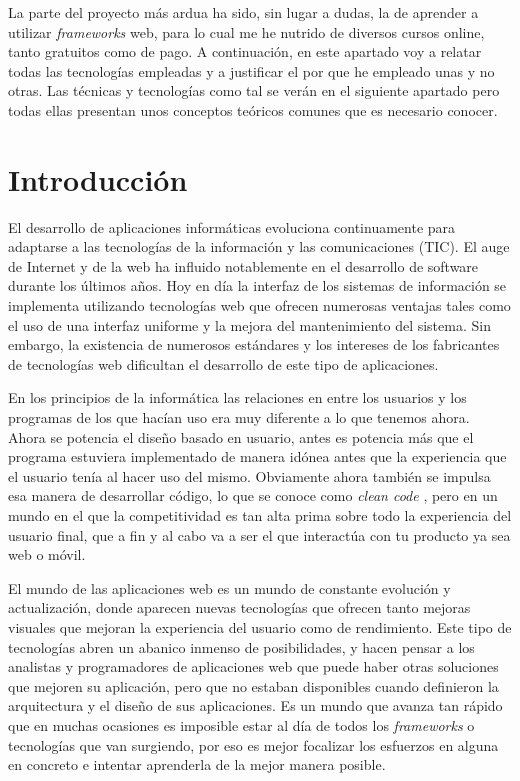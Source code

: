
La parte del proyecto más ardua ha sido, sin lugar a dudas, la de aprender a utilizar \emph{frameworks}  web, para lo cual me he nutrido de diversos cursos online, tanto gratuitos como de pago. A continuación, en este apartado voy a relatar todas las tecnologías empleadas y a justificar el por que he empleado unas y no otras. Las técnicas y tecnologías como tal se verán en el siguiente apartado pero todas ellas presentan unos conceptos teóricos comunes que es necesario conocer. 


\section{Introducción}\label{teorico-introduccion}
El desarrollo de aplicaciones informáticas evoluciona continuamente para adaptarse a las tecnologías de la información y las comunicaciones (TIC). El auge de Internet y de la web ha influido notablemente en el desarrollo de software durante los últimos años. Hoy en día la interfaz de los sistemas de información se implementa utilizando tecnologías web que ofrecen numerosas ventajas tales como el uso de una interfaz uniforme y la mejora del mantenimiento del sistema. Sin embargo, la existencia de numerosos estándares y los intereses de los fabricantes de tecnologías web dificultan el desarrollo de este tipo de aplicaciones. 

En los principios de la informática las relaciones en entre los usuarios y los programas de los que hacían uso era muy diferente a lo que tenemos ahora. Ahora se potencia el diseño basado en usuario, antes es potencia más que el programa estuviera implementado de manera idónea antes que la experiencia que el usuario tenía al hacer uso del mismo. Obviamente ahora también se impulsa esa manera de desarrollar código, lo que se conoce como \emph{clean code} \cite{cleancode}, pero en un mundo en el que la competitividad es tan alta prima sobre todo la experiencia del usuario final, que a fin y al cabo va a ser el que interactúa con tu producto ya sea web o móvil. 




El mundo de las aplicaciones web es un mundo de constante evolución y actualización, donde aparecen nuevas tecnologías que ofrecen tanto mejoras visuales que mejoran la experiencia del usuario como de rendimiento. Este tipo de tecnologías abren un abanico inmenso de posibilidades, y hacen pensar a los analistas y programadores de aplicaciones web que puede haber otras soluciones que mejoren su aplicación, pero que no estaban disponibles cuando definieron la arquitectura y el diseño de sus aplicaciones. Es un mundo que avanza tan rápido que en muchas ocasiones es imposible estar al día de todos los  \emph{frameworks} o tecnologías que van surgiendo, por eso es mejor focalizar los esfuerzos en alguna en concreto e intentar aprenderla de la mejor manera posible. 




